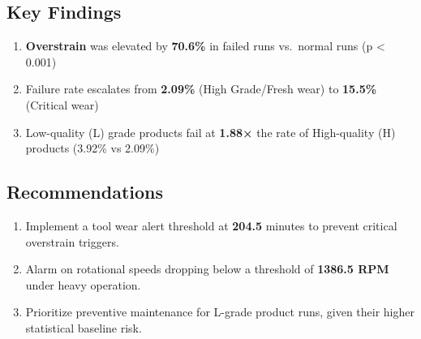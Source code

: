 \documentclass[
]{article}
\providecommand{\tightlist}{%
  \setlength{\itemsep}{0pt}\setlength{\parskip}{0pt}}
\begin{document}
\subsection{Key Findings}\label{key-findings}

\begin{enumerate}
\def\labelenumi{\arabic{enumi}.}
\tightlist
\item
  \textbf{Overstrain} was elevated by \textbf{70.6\%} in failed runs
  vs.~normal runs (p \textless{} 0.001)
\item
  Failure rate escalates from \textbf{2.09\%} (High Grade/Fresh wear) to
  \textbf{15.5\%} (Critical wear)\\
\item
  Low-quality (L) grade products fail at \textbf{1.88×} the rate of
  High-quality (H) products (3.92\% vs 2.09\%)
\end{enumerate}

\subsection{Recommendations}\label{recommendations}

\begin{enumerate}
\def\labelenumi{\arabic{enumi}.}
\tightlist
\item
  Implement a tool wear alert threshold at \textbf{204.5} minutes to
  prevent critical overstrain triggers.
\item
  Alarm on rotational speeds dropping below a threshold of
  \textbf{1386.5 RPM} under heavy operation.
\item
  Prioritize preventive maintenance for L-grade product runs, given
  their higher statistical baseline risk.
\end{enumerate}
\end{document}
